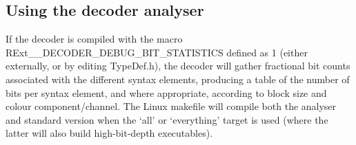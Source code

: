 \documentclass[a4paper,11pt]{jctvcdoc}
\begin{document}
\subsection{Using the decoder analyser}
If the decoder is compiled with the macro RExt__DECODER_DEBUG_BIT_STATISTICS defined as 1 (either externally, or by editing TypeDef.h), the decoder will gather fractional bit counts associated with the different syntax elements, producing a table of the number of bits per syntax element, and where appropriate, according to block size and colour component/channel.
The Linux makefile will compile both the analyser and standard version when the `all' or `everything' target is used (where the latter will also build  high-bit-depth executables).
\end{document}
